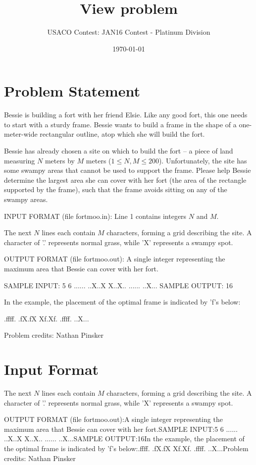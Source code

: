 \documentclass[12pt]{article}
\title{View problem}
\author{USACO Contest: JAN16 Contest - Platinum Division}
\date{\today}
\begin{document}
\maketitle

\section*{Problem Statement}

Bessie is building a fort with her friend Elsie. Like any good fort, this one
needs to start with a sturdy frame. Bessie wants to build a frame in the shape
of a one-meter-wide rectangular outline, atop which she will build the fort.

Bessie has already chosen a site on which to build the fort -- a piece of land
measuring $N$ meters by $M$ meters ($1 \leq N, M \leq 200$). Unfortunately, the 
site has some swampy areas that cannot be used to support the frame.  Please
help Bessie determine the largest area she can cover with her fort (the area of
the rectangle supported by the frame), such that the frame avoids sitting on any
of the swampy areas.

INPUT FORMAT (file fortmoo.in):
Line 1 contains integers $N$ and $M$.  

The next $N$ lines each contain $M$ characters, forming a grid describing the 
site.  A character of '.' represents normal grass, while 'X' represents a swampy
spot.

OUTPUT FORMAT (file fortmoo.out):
A single integer representing the maximum area that Bessie can cover with her
fort.

SAMPLE INPUT:
5 6
......
..X..X
X..X..
......
..X...
SAMPLE OUTPUT: 
16

In the example, the placement of the optimal frame is indicated by 'f's below:

.ffff.
.fX.fX
Xf.Xf.
.ffff.
..X...

Problem credits: Nathan Pinsker



\section*{Input Format}
The next $N$ lines each contain $M$ characters, forming a grid describing the 
site.  A character of '.' represents normal grass, while 'X' represents a swampy
spot.

OUTPUT FORMAT (file fortmoo.out):A single integer representing the maximum area that Bessie can cover with her
fort.SAMPLE INPUT:5 6
......
..X..X
X..X..
......
..X...SAMPLE OUTPUT:16In the example, the placement of the optimal frame is indicated by 'f's below:.ffff.
.fX.fX
Xf.Xf.
.ffff.
..X...Problem credits: Nathan Pinsker
\end{document}
